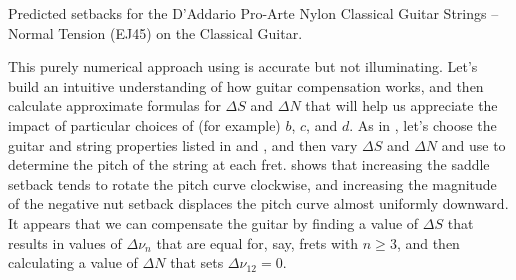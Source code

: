  \begin{table}[htbp]
  \centering
  \caption{\label{tbl:ej45_setbacks} Predicted setbacks for the D'Addario Pro-Arte Nylon Classical Guitar Strings -- Normal Tension (EJ45) on the Classical Guitar.}
  
\end{table}%


This purely numerical approach using  is accurate but not illuminating. Let's build an intuitive understanding of how guitar compensation works, and then calculate approximate formulas for $\Delta S$ and $\Delta N$ that will help us appreciate the impact of particular choices of (for example) $b$, $c$, and $d$. As in , let's choose the guitar and string properties listed in  and , and then vary $\Delta S$ and $\Delta N$ and use  to determine the pitch of the string at each fret.  shows that increasing the saddle setback tends to rotate the pitch curve clockwise, and increasing the magnitude of the negative nut setback displaces the pitch curve almost uniformly downward. It appears that we can compensate the guitar by finding a value of $\Delta S$ that results in values of $\Delta \nu_n$ that are equal for, say, frets with $n \ge 3$, and then calculating a value of $\Delta N$ that sets $\Delta \nu_{12} = 0$.

